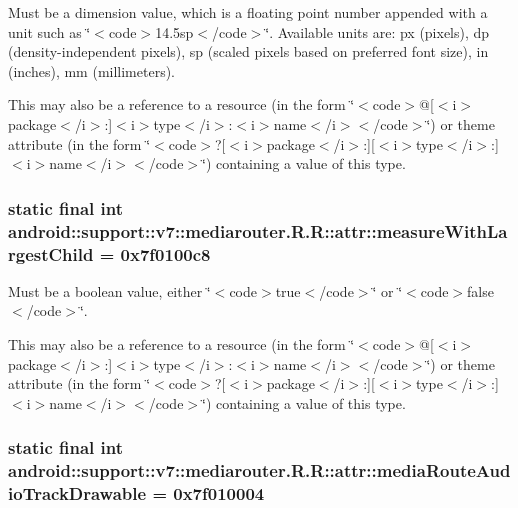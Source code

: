 Must be a dimension value, which is a floating point number appended with a unit such as \char`\"{}$<$code$>$14.5sp$<$/code$>$\char`\"{}. Available units are: px (pixels), dp (density-independent pixels), sp (scaled pixels based on preferred font size), in (inches), mm (millimeters). 

This may also be a reference to a resource (in the form \char`\"{}$<$code$>$@\mbox{[}$<$i$>$package$<$/i$>$:\mbox{]}$<$i$>$type$<$/i$>$:$<$i$>$name$<$/i$>$$<$/code$>$\char`\"{}) or theme attribute (in the form \char`\"{}$<$code$>$?\mbox{[}$<$i$>$package$<$/i$>$:\mbox{]}\mbox{[}$<$i$>$type$<$/i$>$:\mbox{]}$<$i$>$name$<$/i$>$$<$/code$>$\char`\"{}) containing a value of this type. \hypertarget{classandroid_1_1support_1_1v7_1_1mediarouter_1_1_r_1_1attr_c3a1ee928352fa0b12b84127f2b21c6f}{
\subsubsection[{measureWithLargestChild}]{\setlength{\rightskip}{0pt plus 5cm}static final int android::support::v7::mediarouter.R.R::attr::measureWithLargestChild = 0x7f0100c8}}
\label{classandroid_1_1support_1_1v7_1_1mediarouter_1_1_r_1_1attr_c3a1ee928352fa0b12b84127f2b21c6f}


Must be a boolean value, either \char`\"{}$<$code$>$true$<$/code$>$\char`\"{} or \char`\"{}$<$code$>$false$<$/code$>$\char`\"{}. 

This may also be a reference to a resource (in the form \char`\"{}$<$code$>$@\mbox{[}$<$i$>$package$<$/i$>$:\mbox{]}$<$i$>$type$<$/i$>$:$<$i$>$name$<$/i$>$$<$/code$>$\char`\"{}) or theme attribute (in the form \char`\"{}$<$code$>$?\mbox{[}$<$i$>$package$<$/i$>$:\mbox{]}\mbox{[}$<$i$>$type$<$/i$>$:\mbox{]}$<$i$>$name$<$/i$>$$<$/code$>$\char`\"{}) containing a value of this type. \hypertarget{classandroid_1_1support_1_1v7_1_1mediarouter_1_1_r_1_1attr_530a3f6ab74b93207943412e621cc73e}{
\subsubsection[{mediaRouteAudioTrackDrawable}]{\setlength{\rightskip}{0pt plus 5cm}static final int android::support::v7::mediarouter.R.R::attr::mediaRouteAudioTrackDrawable = 0x7f010004}}
\label{classandroid_1_1support_1_1v7_1_1mediarouter_1_1_r_1_1attr_530a3f6ab74b93207943412e621cc73e}


